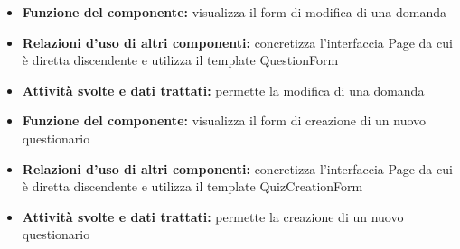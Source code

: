 			\begin{itemize}
		    		\item\textbf{Funzione del componente:} visualizza il form di modifica di una domanda
				\item\textbf{Relazioni d'uso di altri componenti:} concretizza l'interfaccia Page da cui è diretta discendente e utilizza il template QuestionForm
				\item\textbf{Attività svolte e dati trattati:} permette la modifica di una domanda
			\end{itemize}
			\begin{itemize}
		    		\item\textbf{Funzione del componente:} visualizza il form di creazione di un nuovo questionario
				\item\textbf{Relazioni d'uso di altri componenti:} concretizza l'interfaccia Page da cui è diretta discendente e utilizza il template QuizCreationForm
				\item\textbf{Attività svolte e dati trattati:} permette la creazione di un nuovo questionario
			\end{itemize}
			
